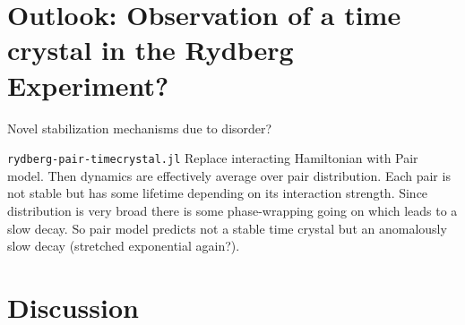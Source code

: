 \chapter{Outlook: Observation of a time crystal in the Rydberg Experiment?}
Novel stabilization mechanisms due to disorder?

\texttt{rydberg-pair-timecrystal.jl}
Replace interacting Hamiltonian with Pair model. Then dynamics are effectively average over pair  distribution. Each pair is not stable but has some lifetime depending on its interaction strength. Since distribution is very broad there is some phase-wrapping going on which leads to a slow decay. So pair model predicts not a stable time crystal but an anomalously slow decay (stretched exponential again?).

\chapter{Discussion}\label{ch:floquet-discussion}

